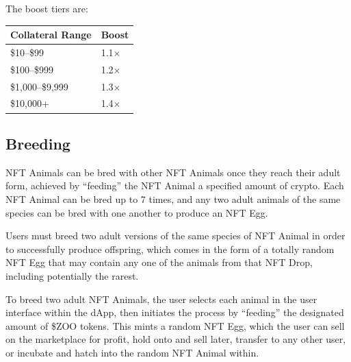 \noindent The boost tiers are:
\begin{center}
\begin{tabular}{ll}
\toprule
\textbf{Collateral Range} & \textbf{Boost} \\
\midrule
\$10--\$99   & 1.1$\times$ \\
\$100--\$999  & 1.2$\times$ \\
\$1{,}000--\$9{,}999 & 1.3$\times$ \\
\$10{,}000+  & 1.4$\times$ \\
\bottomrule
\end{tabular}
\end{center}

\subsection{Breeding}

NFT Animals can be bred with other NFT Animals once they reach their adult form, achieved by ``feeding'' the NFT Animal a specified amount of crypto. Each NFT Animal can be bred up to 7 times, and any two adult animals of the same species can be bred with one another to produce an NFT Egg.

Users must breed two adult versions of the same species of NFT Animal in order to successfully produce offspring, which comes in the form of a totally random NFT Egg that may contain any one of the animals from that NFT Drop, including potentially the rarest.

To breed two adult NFT Animals, the user selects each animal in the user interface within the dApp, then initiates the process by ``feeding'' the designated amount of \$ZOO tokens. This mints a random NFT Egg, which the user can sell on the marketplace for profit, hold onto and sell later, transfer to any other user, or incubate and hatch into the random NFT Animal within.
